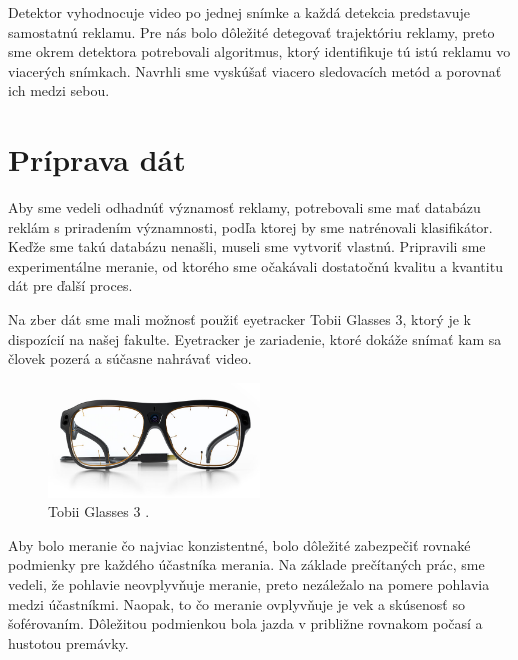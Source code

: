 
Detektor vyhodnocuje video po jednej snímke a každá detekcia predstavuje samostatnú reklamu. Pre nás bolo dôležité detegovať trajektóriu reklamy, preto sme okrem detektora potrebovali algoritmus, ktorý identifikuje tú istú reklamu vo viacerých snímkach. Navrhli sme vyskúšať viacero sledovacích metód a porovnať ich medzi sebou.

\section{Príprava dát}

Aby sme vedeli odhadnúť významosť reklamy, potrebovali sme mať databázu reklám s priradením významnosti, podľa ktorej by sme natrénovali klasifikátor. Keďže sme takú databázu nenašli, museli sme vytvoriť vlastnú. Pripravili sme experimentálne meranie, od ktorého sme očakávali dostatočnú kvalitu a kvantitu dát pre ďalší proces.

Na zber dát sme mali možnosť použiť eyetracker Tobii Glasses 3, ktorý je k dispozícií na našej fakulte. Eyetracker je zariadenie, ktoré dokáže snímať kam sa človek pozerá a súčasne nahrávať video.

\begin{figure}[ht]
    \centering
    \includegraphics[width=0.5\textwidth]{images/03/glasses.jpg}
    \caption{Tobii Glasses 3 \cite{tobii}.}
    \label{img:tobii}
\end{figure}


Aby bolo meranie čo najviac konzistentné, bolo dôležité zabezpečiť rovnaké podmienky pre každého účastníka merania. Na základe prečítaných prác, %
sme vedeli, že pohlavie neovplyvňuje meranie, preto nezáležalo na pomere pohlavia medzi účastníkmi. Naopak, to čo meranie ovplyvňuje je vek a skúsenosť so šoférovaním. Dôležitou podmienkou bola jazda v približne rovnakom počasí a hustotou premávky. 

